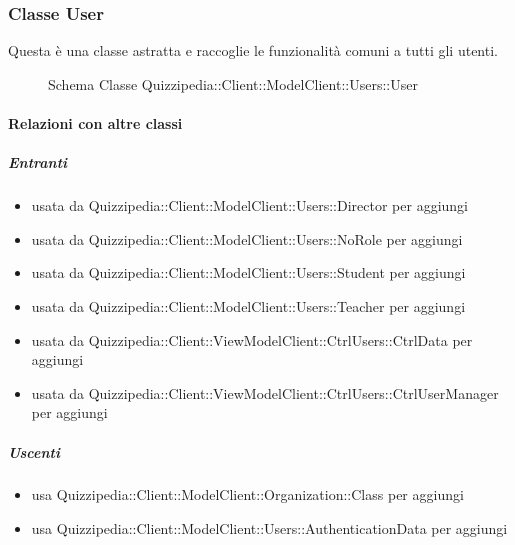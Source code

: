 \subsubsection{Classe User}
Questa è una classe astratta e raccoglie le funzionalità comuni a tutti gli utenti.
\begin{figure}[H]
\centering
\noindent{}
\caption[Schema Classe User]{Schema Classe Quizzipedia::Client::ModelClient::Users::User}
\end{figure}
\paragraph{Relazioni con altre classi}
\subparagraph{Entranti}
\begin{itemize}
\item usata da Quizzipedia::Client::ModelClient::Users::Director per aggiungi
\item usata da Quizzipedia::Client::ModelClient::Users::NoRole per aggiungi
\item usata da Quizzipedia::Client::ModelClient::Users::Student per aggiungi
\item usata da Quizzipedia::Client::ModelClient::Users::Teacher per aggiungi
\item usata da Quizzipedia::Client::ViewModelClient::CtrlUsers::CtrlData per aggiungi
\item usata da Quizzipedia::Client::ViewModelClient::CtrlUsers::CtrlUserManager per aggiungi
\end{itemize}
\subparagraph{Uscenti}
\begin{itemize}
\item usa Quizzipedia::Client::ModelClient::Organization::Class per aggiungi
\item usa Quizzipedia::Client::ModelClient::Users::AuthenticationData per aggiungi
\end{itemize}
